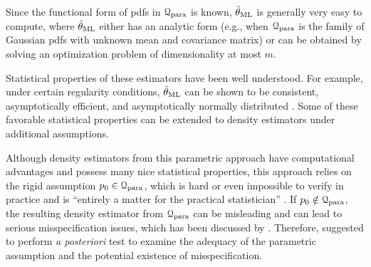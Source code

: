 Since the functional form of pdfs in $\mathcal{Q}_{\mathrm{para}}$ is known, $\hat{\theta}_{\mathrm{ML}}$ is generally very easy to compute, where $\hat{\theta}_{\mathrm{ML}}$ either has an analytic form (e.g., when $\mathcal{Q}_{\mathrm{para}}$ is the family of Gaussian pdfs with unknown mean and covariance matrix) or can be obtained by solving an optimization problem of dimensionality at most $m$. 

Statistical properties of these estimators have been well understood. For example, under certain regularity conditions, $\hat{\theta}_{\mathrm{ML}}$ can be shown to be consistent, asymptotically efficient, and asymptotically normally distributed \parencite{Casella2002-vu}. 
Some of these favorable statistical properties can be extended to density estimators under additional assumptions. 

Although density estimators from this parametric approach have computational advantages and possess many nice statistical properties, this approach relies on the rigid assumption $p_0 \in \mathcal{Q}_{\mathrm{para}}$, which is hard or even impossible to verify in practice and is ``entirely a matter for the practical statistician'' \parencite{Fisher1922-qi}. If $p_0 \notin \mathcal{Q}_{\mathrm{para}}$, the resulting density estimator from $\mathcal{Q}_{\mathrm{para}}$ can be misleading and can lead to serious misspecification issues, which has been discussed by \textcites{Huber1967-sd, White1982-dn}. Therefore, \textcite{Fisher1922-qi} suggested to perform \textit{a posteriori} test to examine the adequacy of the parametric assumption and the potential existence of misspecification. 

